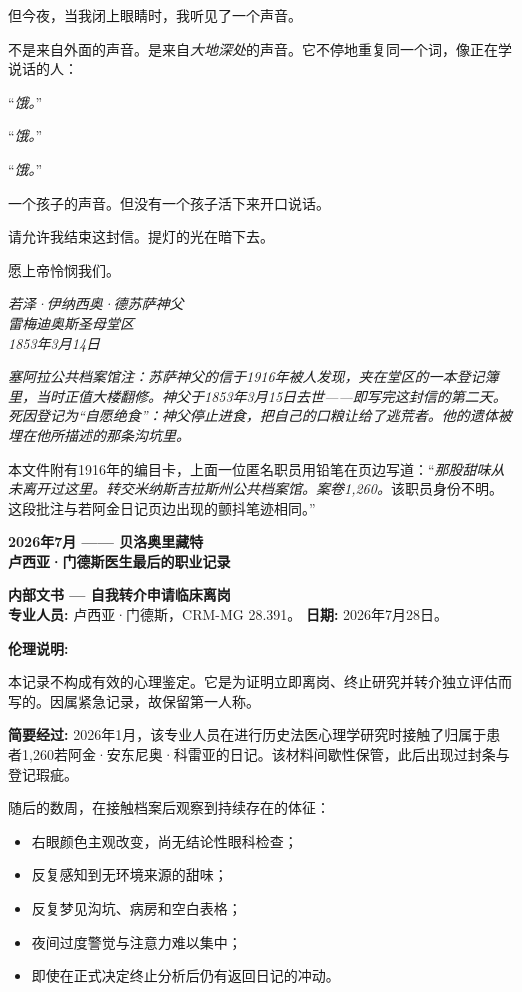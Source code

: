 \noindent 但今夜，当我闭上眼睛时，我听见了一个声音。

\noindent 不是来自外面的声音。是来自\textit{大地深处}的声音。它不停地重复同一个词，像正在学说话的人：

\noindent \textquotedblleft{\textit{饿。}\textquotedblright{}}

\noindent \textquotedblleft{\textit{饿。}\textquotedblright{}}

\noindent \textquotedblleft{\textit{饿。}\textquotedblright{}}

\noindent 一个孩子的声音。但没有一个孩子活下来开口说话。

\noindent 请允许我结束这封信。提灯的光在暗下去。

\noindent 愿上帝怜悯我们。

\noindent \textit{若泽·伊纳西奥·德苏萨神父}\\
\noindent \textit{雷梅迪奥斯圣母堂区}\\
\noindent \textit{1853年3月14日}

\noindent \textit{塞阿拉公共档案馆注：苏萨神父的信于1916年被人发现，夹在堂区的一本登记簿里，当时正值大楼翻修。神父于1853年3月15日去世——即写完这封信的第二天。死因登记为“自愿绝食”：神父停止进食，把自己的口粮让给了逃荒者。他的遗体被埋在他所描述的那条沟坑里。}

\noindent 本文件附有1916年的编目卡，上面一位匿名职员用铅笔在页边写道：\textquotedblleft{\textit{那股甜味从未离开过这里。转交米纳斯吉拉斯州公共档案馆。案卷1,260。}该职员身份不明。这段批注与若阿金日记页边出现的颤抖笔迹相同。\textquotedblright{}}

\noindent \textbf{2026年7月 —— 贝洛奥里藏特}\\
\noindent \textbf{卢西亚·门德斯医生最后的职业记录}

\noindent \textbf{内部文书 --- 自我转介申请临床离岗}\\
\noindent \textbf{专业人员:} 卢西亚·门德斯，CRM-MG 28.391。 \textbf{日期:} 2026年7月28日。

\noindent \textbf{伦理说明:}

\noindent 本记录不构成有效的心理鉴定。它是为证明立即离岗、终止研究并转介独立评估而写的。因属紧急记录，故保留第一人称。

\noindent \textbf{简要经过:}
\noindent 2026年1月，该专业人员在进行历史法医心理学研究时接触了归属于患者1,260若阿金·安东尼奥·科雷亚的日记。该材料间歇性保管，此后出现过封条与登记瑕疵。

\noindent 随后的数周，在接触档案后观察到持续存在的体征：

\begin{itemize}
\item 右眼颜色主观改变，尚无结论性眼科检查；
\item 反复感知到无环境来源的甜味；
\item 反复梦见沟坑、病房和空白表格；
\item 夜间过度警觉与注意力难以集中；
\item 即使在正式决定终止分析后仍有返回日记的冲动。
\end{itemize}

